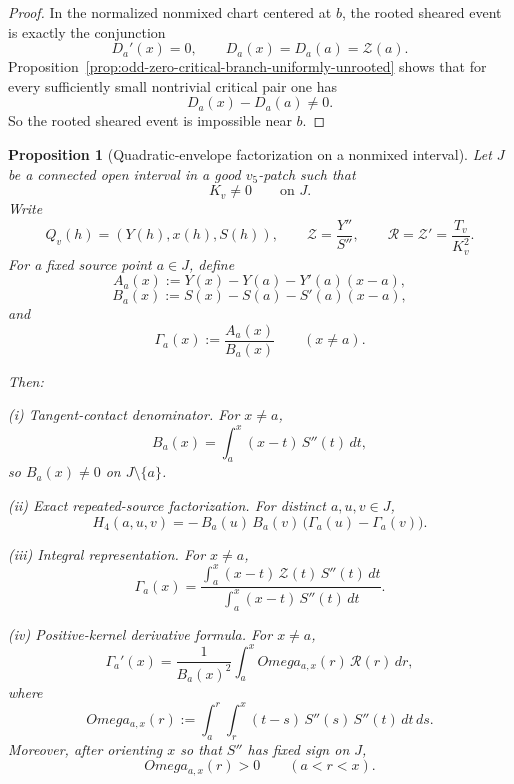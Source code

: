 \documentclass[11pt,a4paper]{amsart}
\def\Omega{Omega}%
\theoremstyle{plain}
\newtheorem{proposition}[theorem]{Proposition}
\theoremstyle{definition}
\begin{document}
\begin{proof}
In the normalized nonmixed chart centered at $b$, the rooted sheared event is
exactly the conjunction
\[
D_a'(x)=0,
\qquad
D_a(x)=D_a(a)=\mathcal Z(a).
\]
Proposition~\ref{prop:odd-zero-critical-branch-uniformly-unrooted} shows that
for every sufficiently small nontrivial critical pair one has
\[
D_a(x)-D_a(a)\neq 0.
\]
So the rooted sheared event is impossible near $b$.
\end{proof}

\begin{proposition}[Quadratic-envelope factorization on a nonmixed interval]
\label{prop:quadratic-envelope-factorization-nonmixed}
Let $J$ be a connected open interval in a good $v_5$-patch such that
\[
K_v\neq 0
\qquad\text{on }J.
\]
Write
\[
Q_v(h)=(Y(h),x(h),S(h)),
\qquad
\mathcal Z=\frac{Y''}{S''},
\qquad
\mathcal R=\mathcal Z'=\frac{T_v}{K_v^2}.
\]
For a fixed source point $a\in J$, define
\[
A_a(x):=Y(x)-Y(a)-Y'(a)(x-a),
\]
\[
B_a(x):=S(x)-S(a)-S'(a)(x-a),
\]
and
\[
\Gamma_a(x):=\frac{A_a(x)}{B_a(x)}
\qquad (x\neq a).
\]

Then:

\smallskip

\noindent
\emph{(i) Tangent-contact denominator.}
For $x\neq a$,
\[
B_a(x)=\int_a^x (x-t)\,S''(t)\,dt,
\]
so $B_a(x)\neq 0$ on $J\setminus\{a\}$.

\smallskip

\noindent
\emph{(ii) Exact repeated-source factorization.}
For distinct $a,u,v\in J$,
\[
H_4(a,u,v)
=
-\,B_a(u)\,B_a(v)\,\bigl(\Gamma_a(u)-\Gamma_a(v)\bigr).
\]

\smallskip

\noindent
\emph{(iii) Integral representation.}
For $x\neq a$,
\[
\Gamma_a(x)
=
\frac{\displaystyle\int_a^x (x-t)\,\mathcal Z(t)\,S''(t)\,dt}
{\displaystyle\int_a^x (x-t)\,S''(t)\,dt}.
\]

\smallskip

\noindent
\emph{(iv) Positive-kernel derivative formula.}
For $x\neq a$,
\[
\Gamma_a'(x)
=
\frac{1}{B_a(x)^2}\int_a^x \Omega_{a,x}(r)\,\mathcal R(r)\,dr,
\]
where
\[
\Omega_{a,x}(r)
:=
\int_a^r\!\!\int_r^x (t-s)\,S''(s)\,S''(t)\,dt\,ds.
\]
Moreover, after orienting $x$ so that $S''$ has fixed sign on $J$,
\[
\Omega_{a,x}(r)>0
\qquad (a<r<x).
\]
\end{proposition}
\end{document}
